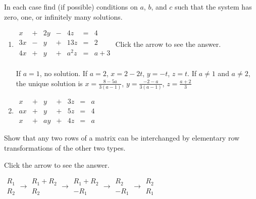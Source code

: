 \documentclass{ximera}
\begin{document}
\begin{problem}\label{prb:no._sol}
In each case find (if possible) conditions on $a$, $b$, and $c$ such that the system has zero, one, or infinitely many solutions.
\begin{enumerate}
\item

$\begin{array}{rlrlrcr}
	  x & + &  2y & - &  4z & = &  4 \\
	 3x & - &   y & + & 13z & = &  2 \\
	 4x & + &   y & + & a^2z & = & a + 3 \\
\end{array}$
Click the arrow to see the answer.
\begin{expandable}
If $a = 1$, no solution. If $a = 2$, $x = 2 - 2t$, $y = -t$, $z = t$. If $a \neq 1$ and $a \neq 2$, the unique  solution is $x = \frac{8 - 5a}{3(a - 1)}$, $y = \frac{-2 - a}{3(a - 1)}$, $z = \frac{a + 2}{3}$
\end{expandable}
\item

$\begin{array}{rlrlrcr}
	  x & + &   y & + &  3z & = &  a \\
	 ax & + &   y & + &  5z & = &  4 \\
	  x & + &  ay & + &  4z & = &  a
\end{array}$
\end{enumerate}
\end{problem}

\begin{problem}\label{prb:elementaryrowops}
Show that any two rows of a matrix can be interchanged by elementary row transformations of the other two types.

Click the arrow to see the answer.
\begin{expandable}
$\begin{matrix}
	R_1 \\
	R_2
\end{matrix}
\to \begin{matrix}
	R_1 + R_2 \\
	R_2
\end{matrix}
\to
\begin{matrix}
	R_1 + R_2 \\
	-R_1
\end{matrix}
\to
\begin{matrix}
	R_2 \\
	-R_1
\end{matrix}
\to
\begin{matrix}
	R_2 \\
	R_1
\end{matrix}$
\end{expandable}
\end{problem}
\end{document}
